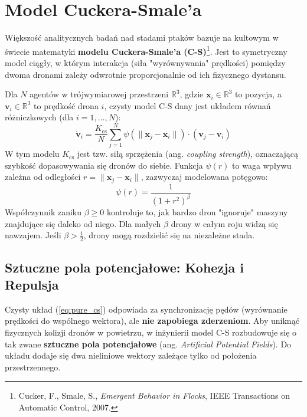 \section{Model Cuckera-Smale'a}

Większość analitycznych badań nad stadami ptaków bazuje na kultowym w świecie matematyki \textbf{modelu Cuckera-Smale'a (C-S)}\footnote{Cucker, F., Smale, S., \textit{Emergent Behavior in Flocks}, IEEE Transactions on Automatic Control, 2007.}. Jest to symetryczny model ciągły, w którym interakcja (siła "wyrównywania" prędkości) pomiędzy dwoma dronami zależy odwrotnie proporcjonalnie od ich fizycznego dystansu.

Dla $N$ agentów w trójwymiarowej przestrzeni $\mathbb{R}^3$, gdzie $\mathbf{x}_i \in \mathbb{R}^3$ to pozycja, a $\mathbf{v}_i \in \mathbb{R}^3$ to prędkość drona $i$, czysty model C-S dany jest układem równań różniczkowych (dla $i = 1, \dots, N$):
\begin{equation}
    \mathbf{\dot{v}}_i = \frac{K_{\text{cs}}}{N} \sum_{j=1}^{N} \psi(\|\mathbf{x}_j - \mathbf{x}_i\|) \cdot (\mathbf{v}_j - \mathbf{v}_i)
    \label{eq:pure_cs}
\end{equation}
W tym modelu $K_{\text{cs}}$ jest tzw. siłą sprzężenia (ang. \textit{coupling strength}), oznaczającą szybkość dopasowywania się dronów do siebie. Funkcja $\psi(r)$ to waga wpływu zależna od odległości $r = \|\mathbf{x}_j - \mathbf{x}_i\|$, zazwyczaj modelowana potęgowo:
\begin{equation}
    \psi(r) = \frac{1}{(1 + r^2)^\beta}
\end{equation}
Współczynnik zaniku $\beta \ge 0$ kontroluje to, jak bardzo dron "ignoruje" maszyny znajdujące się daleko od niego. Dla małych $\beta$ drony w całym roju widzą się nawzajem. Jeśli $\beta > \frac{1}{2}$, drony mogą rozdzielić się na niezależne stada.

\subsection{Sztuczne pola potencjałowe: Kohezja i Repulsja}

Czysty układ (\ref{eq:pure_cs}) odpowiada za synchronizację pędów (wyrównanie prędkości do wspólnego wektora), ale \textbf{nie zapobiega zderzeniom}. Aby uniknąć fizycznych kolizji dronów w powietrzu, w inżynierii model C-S rozbudowuje się o tak zwane \textbf{sztuczne pola potencjałowe} (ang. \textit{Artificial Potential Fields}). Do układu dodaje się dwa nieliniowe wektory zależące tylko od położenia przestrzennego.

